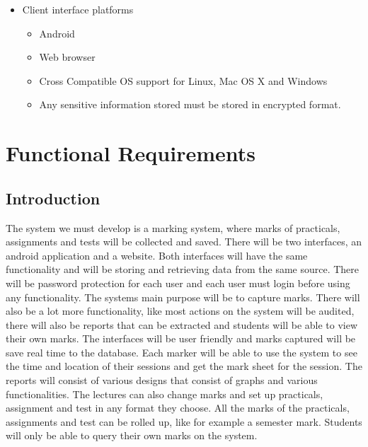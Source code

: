 \documentclass[10pt,a4paper]{article}
\begin{document}
                \begin{itemize}
                        \item Client interface platforms
                                                        \begin{itemize}
                                                                \item Android
                                                                \item Web browser
                                                                \item Cross Compatible OS support for Linux, Mac OS X and Windows
                                                                \item Any sensitive information stored must be stored in encrypted format.
                                                        \end{itemize}                                           
                \end{itemize}                                           
                
\section{Functional Requirements}
\subsection{Introduction}

The system we must develop is a marking system, where marks of practicals, assignments and tests will be collected and saved. There will be two interfaces, an android application and a website. Both interfaces will have the same functionality and will be storing and retrieving data from the same source.\linebreak
There will be password protection for each user and each user must login before using any functionality.
\linebreak
The systems main purpose will be to capture marks. There will also be a lot more functionality, like most actions on the system will be audited, there will also be reports that can be extracted and students will be able to view their own marks.\linebreak
The interfaces will be user friendly and marks captured will be save real time to the database. Each marker will be able to use the system to see the time and location of their sessions and get the mark sheet for the session. \linebreak
The reports will consist of various designs that consist of graphs and various functionalities. The lectures can also change marks and set up practicals, assignment and test in any format they choose. All the marks of the practicals, assignments and test can be rolled up, like for example a semester mark. Students will only be able to query their own marks on the system. 
\end{document}
